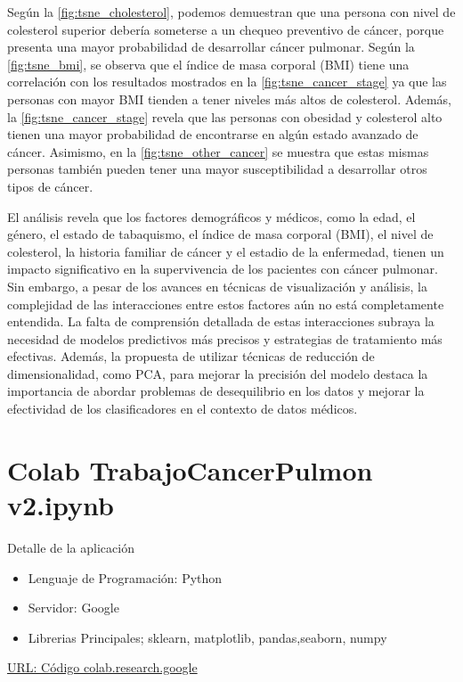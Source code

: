 \documentclass[10pt,journal,compsoc]{IEEEtran}
\begin{document}
Según la \autoref{fig:tsne_cholesterol}, podemos demuestran que una persona con nivel de colesterol superior debería someterse a un chequeo preventivo de cáncer, porque presenta una mayor probabilidad de desarrollar  cáncer pulmonar. Según la \autoref{fig:tsne_bmi}, se observa que el índice de masa corporal (BMI) tiene una correlación con los resultados mostrados en la  \autoref{fig:tsne_cancer_stage} ya que las personas con mayor BMI tienden a tener niveles más altos de colesterol. Además, la  \autoref{fig:tsne_cancer_stage} revela que las personas con obesidad y colesterol alto tienen una mayor probabilidad de encontrarse en algún estado avanzado de cáncer. Asimismo, en la \autoref{fig:tsne_other_cancer} se muestra que estas mismas personas también pueden tener una mayor susceptibilidad a desarrollar otros tipos de cáncer.

El análisis revela que los factores demográficos y médicos, como la edad, el género, el estado de tabaquismo, el índice de masa corporal (BMI), el nivel de colesterol, la historia familiar de cáncer y el estadio de la enfermedad, tienen un impacto significativo en la supervivencia de los pacientes con cáncer pulmonar. Sin embargo, a pesar de los avances en técnicas de visualización y análisis, la complejidad de las interacciones entre estos factores aún no está completamente entendida. La falta de comprensión detallada de estas interacciones subraya la necesidad de modelos predictivos más precisos y estrategias de tratamiento más efectivas. Además, la propuesta de utilizar técnicas de reducción de dimensionalidad, como PCA, para mejorar la precisión del modelo destaca la importancia de abordar problemas de desequilibrio en los datos y mejorar la efectividad de los clasificadores en el contexto de datos médicos.



\appendices
\section{Colab TrabajoCancerPulmon v2.ipynb}
Detalle de la aplicación
\begin{itemize}
  \item Lenguaje de Programación: Python
  \item Servidor: Google
  \item Librerias Principales; sklearn, matplotlib, pandas,seaborn, numpy
\end{itemize}
\href{https://colab.research.google.com/drive/1-HcDMOWJxGsakeZxqYCUc18EXPyz__4q?usp=sharing}{URL: Código  colab.research.google }
\end{document}

